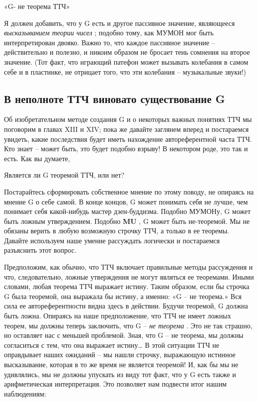 \documentclass[../main.tex]{subfiles}
\begin{document}
«G- не теорема ТТЧ»

Я должен добавить, что у G есть и другое пассивное значение, являющееся \emph{высказыванием теории чисел} ; подобно тому, как МУМОН мог быть интерпретирован двояко. Важно то, что каждое пассивное значение \--- действительно и полезно, и никоим образом не бросает тень сомнения на второе значение. (Тот факт, что играющий патефон может вызывать колебания в самом себе и в пластинке, не отрицает того, что эти колебания \--- музыкальные звуки!)


\subsection{В неполноте ТТЧ виновато существование G}

Об изобретательном методе создания G и о некоторых важных понятиях ТТЧ мы поговорим в главах XIII и XIV; пока же давайте заглянем вперед и постараемся увидеть, какие последствия будет иметь нахождение автореферентной часта ТТЧ. Кто знает \--- может быть, это будет подобно взрыву! В некотором роде, это так и есть. Как вы думаете,

Является ли G теоремой ТТЧ, или нет?

Постарайтесь сформировать собственное мнение по этому поводу, не опираясь на мнение G о себе самой. В конце концов, G может понимать себя не лучше, чем понимает себя какой-нибудь мастер дзен-буддизма. Подобно МУМОНу, G может быть ложным утверждением. Подобно \textbf{MU} , G может быть не-теоремой. Мы не обязаны верить в любую возможную строчку ТТЧ, а только в ее теоремы. Давайте используем наше умение рассуждать логически и постараемся разъяснить этот вопрос.

Предположим, как обычно, что ТТЧ включает правильные методы рассуждения и что, следовательно, ложные утверждения не могут являться ее теоремами. Иными словами, любая теорема ТТЧ выражает истину. Таким образом, если бы строчка G была теоремой, она выражала бы истину, а именно: «G \--- не теорема.» Вся сила ее автореферентности видна здесь в действии. Будучи теоремой, G должна быть ложна. Опираясь на наше предположение, что ТТЧ не имеет ложных теорем, мы должны теперь заключить, что G \--- \emph{не теорема} . Это не так страшно, но оставляет нас с меньшей проблемой. Зная, что G \--- не теорема, мы должны согласиться с тем, что она выражает истину\ldots{} В этой ситуации ТТЧ не оправдывает наших ожиданий \--- мы нашли строчку, выражающую истинное высказывание, которая в то же время не является теоремой! И, как бы мы не удивлялись, мы не должны упускать из виду тот факт, что у G есть также и арифметическая интерпретация. Это позволяет нам подвести итог нашим наблюдениям:
\end{document}
